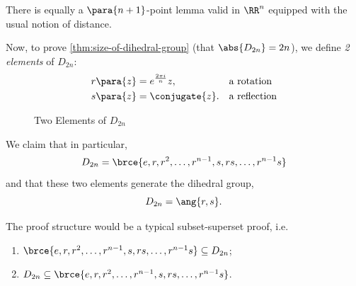 \begin{remark}
    There is equally a \(\para{n + 1}\)-point lemma valid in \(\RR^n\) equipped with the usual notion of distance.
\end{remark}

Now, to prove \autoref{thm:size-of-dihedral-group} (that \(\abs{D_{2n}} = 2n\)), we define \emph{2 elements} of \(D_{2n}\):
\begin{align*}
    r\para{z} &= e^{\frac{2 \pi i}{n}} z, && \text{a rotation} \\
    s\para{z} &= \conjugate{z}. && \text{a reflection} \\
\end{align*}

\begin{figure}[ht!]
    \centering
    \caption{Two Elements of \(D_{2n}\)}
    \label{fig:two-elements-of-d-2n}
\end{figure}

We claim that in particular,
\[
    D_{2n} = \brce{e, r, r^2, \ldots, r^{n - 1}, s, rs, \ldots, r^{n - 1} s}
\]
and that these two elements generate the dihedral group,
\[
    D_{2n} = \ang{r, s}.
\]

The proof structure would be a typical subset-superset proof, i.e.
\begin{enumerate}
    \item \(\brce{e, r, r^2, \ldots, r^{n - 1}, s, rs, \ldots, r^{n - 1} s} \subseteq D_{2n}\);
    \item \(D_{2n} \subseteq \brce{e, r, r^2, \ldots, r^{n - 1}, s, rs, \ldots, r^{n - 1} s}\).
\end{enumerate}

